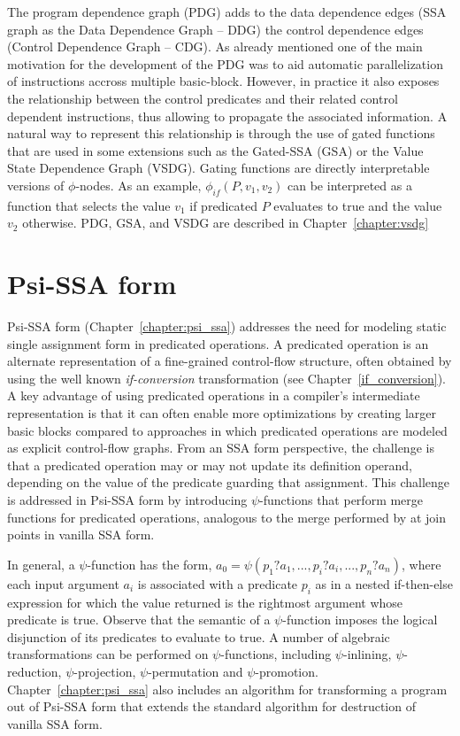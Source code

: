 The program dependence graph (PDG) adds to the data dependence edges (SSA graph as the Data Dependence Graph -- DDG) the control dependence edges (Control Dependence Graph -- CDG).
As already mentioned one of the main motivation for the development of the PDG was to aid automatic parallelization of instructions accross multiple basic-block.
However, in practice it also exposes the relationship between the control predicates and their related control dependent instructions, thus allowing to propagate the associated information.
A natural way to represent this relationship is through the use of gated functions that are used in some extensions such as the Gated-SSA (GSA) or the Value State Dependence Graph (VSDG).
Gating functions are directly interpretable versions of $\phi$-nodes.
As an example, $\phi_\textit{if}(P, v_1, v_2)$ can be interpreted as a function that selects the value $v_1$ if predicated $P$ evaluates to true and the value $v_2$ otherwise.
PDG, GSA, and VSDG are described in Chapter~\ref{chapter:vsdg}

\section{Psi-SSA form}

Psi-SSA form (Chapter~\ref{chapter:psi_ssa}) addresses the need for modeling static single assignment form in predicated operations. 
A predicated operation is an alternate representation of a fine-grained control-flow structure, often obtained by using the well known {\em if-conversion} transformation (see Chapter~\ref{if_conversion}). 
A key advantage of using predicated operations in a compiler's intermediate representation is that it can often enable more optimizations by creating larger basic blocks compared to approaches in which predicated operations are modeled as explicit control-flow graphs. 
From an SSA form perspective, the challenge is that a predicated operation may or may not update its definition operand, depending on the value of the predicate guarding that assignment. 
This challenge is addressed in Psi-SSA form by introducing $\psi$-functions that perform merge functions for predicated operations, analogous to the merge performed by \phifuns at join points in vanilla SSA form.

In general, a $\psi$-function has the form, $a_0 = \psi\left(p_1?a_1, ..., p_i?a_i, ..., p_n?a_n\right)$, where each input argument $a_i$ is associated with a predicate $p_i$ as in a nested if-then-else expression for which the value returned is the rightmost argument whose predicate is true. 
Observe that the semantic of a $\psi$-function imposes the logical disjunction of its predicates to evaluate to true. 
A number of algebraic transformations can be performed on $\psi$-functions, including $\psi$-inlining, $\psi$-reduction, $\psi$-projection, $\psi$-permutation and $\psi$-promotion. 
Chapter~\ref{chapter:psi_ssa} also includes an algorithm for transforming a program out of Psi-SSA form that extends the standard algorithm for destruction of vanilla SSA form. 



